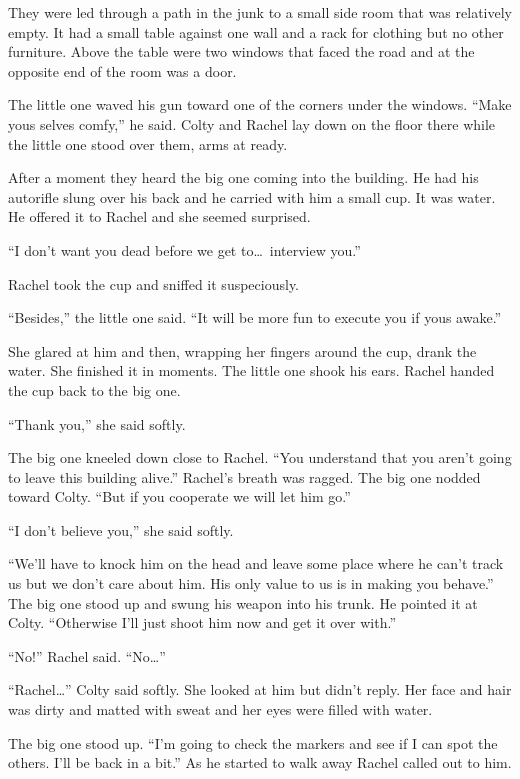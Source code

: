 They were led through a path in the junk to a small side room that was relatively empty. It had
a small table against one wall and a rack for clothing but no other furniture. Above the table
were two windows that faced the road and at the opposite end of the room was a door.

The little one waved his gun toward one of the corners under the windows. ``Make yous selves
comfy,'' he said. Colty and Rachel lay down on the floor there while the little one stood over
them, arms at ready.

After a moment they heard the big one coming into the building. He had his autorifle slung over
his back and he carried with him a small cup. It was water. He offered it to Rachel and she
seemed surprised.

``I don't want you dead before we get to\ldots\ interview you.''

Rachel took the cup and sniffed it suspeciously. 

``Besides,'' the little one said. ``It will be more fun to execute you if yous awake.''

She glared at him and then, wrapping her fingers around the cup, drank the water. She finished
it in moments. The little one shook his ears. Rachel handed the cup back to the big one.

``Thank you,'' she said softly.

The big one kneeled down close to Rachel. ``You understand that you aren't going to leave this
building alive.'' Rachel's breath was ragged. The big one nodded toward Colty. ``But if you
cooperate we will let him go.''

``I don't believe you,'' she said softly.

``We'll have to knock him on the head and leave some place where he can't track us but we don't
care about him. His only value to us is in making you behave.'' The big one stood up and swung
his weapon into his trunk. He pointed it at Colty. ``Otherwise I'll just shoot him now and get
it over with.''

``No!'' Rachel said. ``No\ldots''

``Rachel\ldots'' Colty said softly. She looked at him but didn't reply. Her face and hair was
dirty and matted with sweat and her eyes were filled with water.

The big one stood up. ``I'm going to check the markers and see if I can spot the others. I'll be
back in a bit.'' As he started to walk away Rachel called out to him.

